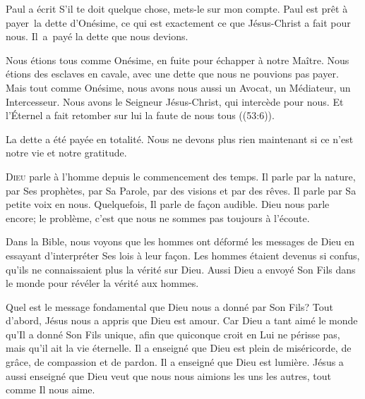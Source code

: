 
Paul a écrit\frcolon {}
 \Og S'il 
 te doit quelque chose, mets-le sur mon compte. \Fg{}
 Paul est prêt à payer~la dette d'Onésime,
 ce qui est 
 exactement ce que Jésus-Christ a fait pour nous.
 Il~a~payé la dette que nous devions. 

Nous étions tous comme Onésime, en fuite pour échapper à notre Maître.
 Nous étions des esclaves en cavale, avec une dette que nous ne pouvions
 pas payer.
 Mais tout comme Onésime, nous avons nous aussi un Avocat, un Médiateur,
 un Intercesseur. Nous avons le Seigneur Jésus-Christ,
 qui intercède pour nous.
 \Og Et l'Éternel a fait retomber sur lui la faute de nous tous \Fg{}
 ((53:6)). 

La dette a été payée en totalité.
 Nous ne devons plus rien maintenant
 \ocadr si ce n'est notre vie et notre gratitude.

\dvrule






\lettrine{D}{ieu} parle à l'homme depuis le commencement des temps.
 Il parle par la nature, par Ses prophètes, par Sa Parole, par des visions
 et par des rêves.
 Il parle par Sa petite voix en nous. Quelquefois, Il parle de fa\c{c}on audible.
 Dieu nous parle encore; le problème, c'est que nous ne sommes pas toujours
 à l'écoute. 

Dans la Bible, nous voyons que les hommes ont déformé les messages de Dieu
 en essayant d'interpréter Ses lois à leur fa\c{c}on.
 Les hommes étaient devenus si confus, qu'ils ne connaissaient plus
 la vérité sur Dieu.
 Aussi Dieu a envoyé Son Fils dans le monde
 pour révéler la vérité aux hommes. 


Quel est le message fondamental que Dieu nous a donné par Son Fils?
 Tout d'abord, Jésus nous a appris que Dieu est amour.
 \Og Car Dieu a tant aimé le monde qu'Il a donné Son Fils unique,
 afin que quiconque croit en Lui ne périsse pas, mais qu'il ait
 la vie éternelle. \Fg{}
 Il a enseigné que Dieu est plein de miséricorde, de grâce,
 de compassion et de pardon. Il a enseigné que Dieu est lumière.
 Jésus a aussi enseigné que Dieu veut que nous nous aimions
 les uns les autres, tout comme Il nous aime. 


